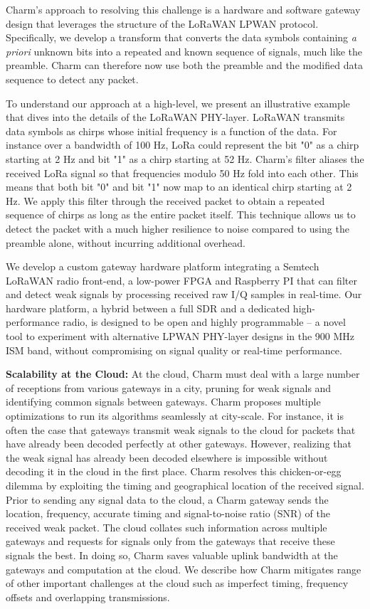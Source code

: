 Charm's approach to resolving this challenge is a hardware and software gateway
design that leverages the structure of the LoRaWAN LPWAN protocol.
Specifically, we develop a transform that converts the data symbols containing
\textit{a priori} unknown bits into a repeated and known sequence of signals,
much like the preamble. Charm can therefore now use both the preamble and the
modified data sequence to detect any packet.

To understand our approach at a high-level, we present an illustrative example
that dives into the details of the LoRaWAN PHY-layer. LoRaWAN transmits data
symbols as chirps whose initial frequency is a function of the data. For
instance over a bandwidth of 100 Hz, LoRa could represent the bit "0" as a
chirp starting at 2 Hz and bit "1" as a chirp starting at 52 Hz. Charm's
filter aliases the received LoRa signal so that frequencies modulo 50 Hz fold
into each other. This means that both bit "0" and bit "1" now map to an
identical chirp starting at 2 Hz. We apply this filter through the received
packet to obtain a repeated sequence of chirps as long as the entire packet
itself. This technique allows us to detect the packet with a much higher
resilience to noise compared to using the preamble alone, without incurring
additional overhead.

We develop a custom gateway hardware platform integrating a Semtech LoRaWAN
radio front-end, a low-power FPGA and Raspberry PI that can filter and detect
weak signals by processing received raw I/Q samples in real-time. Our hardware
platform, a hybrid between a full SDR and a dedicated high-performance radio,
is designed to be open and highly programmable -- a novel tool to experiment
with alternative LPWAN PHY-layer designs in the 900 MHz ISM band, without
compromising on signal quality or real-time performance.

\noindent \textbf{Scalability at the Cloud:} At the cloud, Charm must deal
with a large number of receptions from various gateways in a city, pruning for
weak signals and identifying common signals between gateways. Charm proposes
multiple optimizations to run its algorithms seamlessly at city-scale. For
instance, it is often the case that gateways transmit weak signals to the
cloud for packets that have already been decoded perfectly at other gateways.
However, realizing that the weak signal has already been decoded elsewhere is
impossible without decoding it in the cloud in the first place. Charm resolves
this chicken-or-egg dilemma by exploiting the timing and geographical location
of the received signal. Prior to sending any signal data to the cloud, a Charm
gateway sends the location, frequency, accurate timing and signal-to-noise
ratio (SNR) of the received weak packet. The cloud collates such information
across multiple gateways and requests for signals only from the gateways that
receive these signals the best. In doing so, Charm saves valuable uplink
bandwidth at the gateways and computation at the cloud. We describe how Charm
mitigates range of other important challenges at the cloud such as imperfect
timing, frequency offsets and overlapping transmissions.

